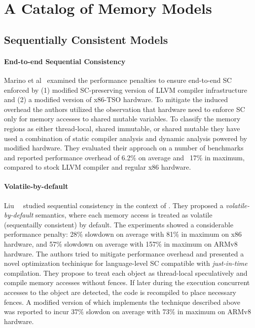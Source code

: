 \section{A Catalog of Memory Models}

\subsection{Sequentially Consistent Models}
\label{sec:catalog:sc}

\paragraph{End-to-end Sequential Consistency}

Marino et al~\cite{Marino-al:PLDI11, Singh-al:ISCA12} 
examined the performance penalties to ensure end-to-end SC
enforced by (1) modified SC-preserving version 
of LLVM compiler infrastructure and 
(2) a modified version of x86-TSO hardware. 
To mitigate the induced overhead the authors 
utilized the observation that hardware need to 
enforce SC only for memory accesses to shared mutable variables. 
To classify the memory regions as either thread-local,
shared immutable, or shared mutable they have used 
a combination of static compiler analysis and 
dynamic analysis powered by modified hardware. 
They evaluated their approach on a number of benchmarks
and reported performance overhead of 6.2\% on average 
and ~17\% in maximum, compared to stock LLVM compiler 
and regular x86 hardware. 

\paragraph{Volatile-by-default}

Liu~\etal~\cite{Liu-al:OOPSLA17, Liu-al:PLDI19} studied 
sequential consistency in the context of \Java.  
They proposed a \emph{volatile-by-default} semantics,
where each memory access is treated as volatile 
(\ie sequentailly consistent) by default. 
The experiments showed a considerable performance penalty:
28\% slowdown on average with 81\% in maximum on x86 hardware,
and 57\% slowdown on average with 157\% in maximum on ARMv8 hardware.
The authors tried to mitigate performance overhead and presented  
a novel optimization techinique for language-level SC
compatible with \emph{just-in-time} compilation. 
They propose to treat each object as thread-local speculatively 
and compile memory accesses without fences. 
If later during the execution concurrent accesses to the object  
are detected, the code is recompiled to place necessary fences.
A modified version of \JVM which implements the technique
described above was reported to incur 37\% slowdon on average 
with 73\% in maximum on ARMv8 hardware.

